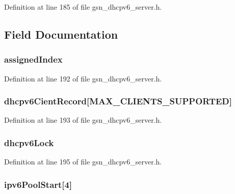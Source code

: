 Definition at line 185 of file gsn\_\-dhcpv6\_\-server.h.



\subsection{Field Documentation}
\hypertarget{a00047_a60dd11d89e78ea4add98607f68802a31}{
\subsubsection[{assignedIndex}]{ {\bf assignedIndex}}}
\label{a00047_a60dd11d89e78ea4add98607f68802a31}


Definition at line 192 of file gsn\_\-dhcpv6\_\-server.h.

\hypertarget{a00047_a7eb7bb83582baba9ff1dce2ac2a6bb12}{
\subsubsection[{dhcpv6CientRecord}]{ {\bf dhcpv6CientRecord}\mbox{[}MAX\_\-CLIENTS\_\-SUPPORTED\mbox{]}}}
\label{a00047_a7eb7bb83582baba9ff1dce2ac2a6bb12}


Definition at line 193 of file gsn\_\-dhcpv6\_\-server.h.

\hypertarget{a00047_a127f3fd8c83b1bda70dce36aba52681f}{
\subsubsection[{dhcpv6Lock}]{ {\bf dhcpv6Lock}}}
\label{a00047_a127f3fd8c83b1bda70dce36aba52681f}


Definition at line 195 of file gsn\_\-dhcpv6\_\-server.h.

\hypertarget{a00047_a9678a3db2e57b60f576c69bfc2fa949b}{
\subsubsection[{ipv6PoolStart}]{ {\bf ipv6PoolStart}\mbox{[}4\mbox{]}}}
\label{a00047_a9678a3db2e57b60f576c69bfc2fa949b}


